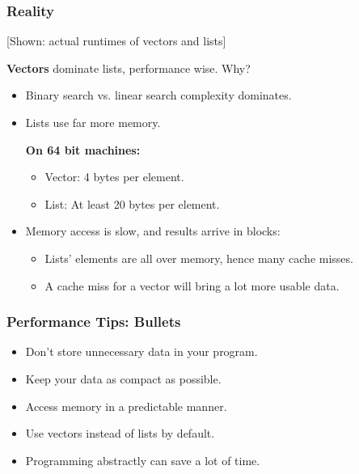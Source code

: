 \begin{frame}
  \frametitle{Reality}
  
  \begin{center}
    [Shown: actual runtimes of vectors and lists]
  \end{center}

  
  {\bf Vectors} dominate lists, performance wise. Why?
  \vfill
  \begin{itemize}
    \item Binary search vs. linear search complexity dominates.
    \vfill
    \item Lists use far more memory.

      {\bf On 64 bit machines:}
      \begin{itemize}
        \item Vector: 4 bytes per element.
        \item List: At least 20 bytes per element.
      \end{itemize}
    \vfill
    \item Memory access is slow, and results arrive in blocks:
      \begin{itemize}
        \item Lists' elements are all over memory, hence many
          cache misses.
        \item A cache miss for a vector will bring a lot more usable data.
      \end{itemize}
  \end{itemize}
  
\end{frame}

\begin{frame}
  \frametitle{Performance Tips: Bullets}

  
  \begin{itemize}
    \item Don't store unnecessary data in your program.
    \vfill
    \item Keep your data as compact as possible.
    \vfill
    \item Access memory in a predictable manner.
    \vfill
    \item Use vectors instead of lists by default.
    \vfill
    \item Programming abstractly can save a lot of time.
  \end{itemize}
  
\end{frame}






